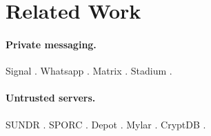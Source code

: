 \section{Related Work}

\paragraph{Private messaging.}
Signal \cite{signal}.
Whatsapp \cite{whatsapp}.
Matrix \cite{matrix}.
Stadium \cite{stadium}.

\paragraph{Untrusted servers.}
SUNDR \cite{sundr}.
SPORC \cite{sporc}.
Depot \cite{depot}.
Mylar \cite{mylar}.
CryptDB \cite{cryptdb}.
